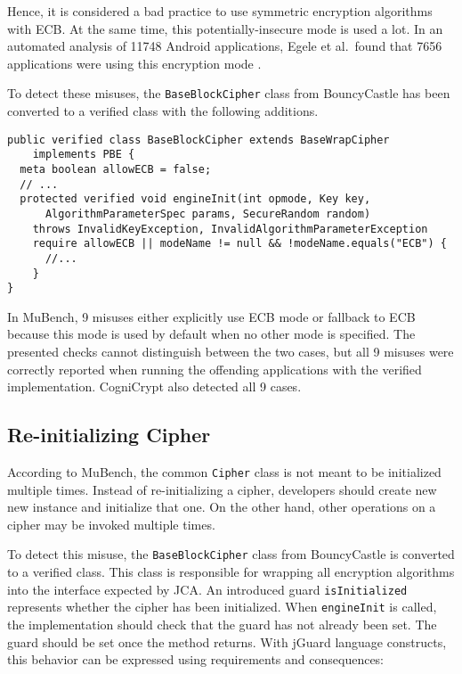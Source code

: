 \documentclass{article}
\newcommand{\etal}{et al.\ }
\begin{document}
Hence, it is considered a bad practice to use symmetric encryption algorithms with ECB.
At the same time, this potentially-insecure mode is used a lot.
In an automated analysis of \num{11748} Android applications, Egele \etal found that \num{7656}
applications were using this encryption mode .

To detect these misuses, the \texttt{BaseBlockCipher} class from BouncyCastle has been converted
to a verified class with the following additions.

\begin{lstlisting}[style=jGuard]
public verified class BaseBlockCipher extends BaseWrapCipher
    implements PBE {
  meta boolean allowECB = false;
  // ...
  protected verified void engineInit(int opmode, Key key, 
      AlgorithmParameterSpec params, SecureRandom random)
    throws InvalidKeyException, InvalidAlgorithmParameterException
    require allowECB || modeName != null && !modeName.equals("ECB") {
      //...
    }
}
\end{lstlisting}

In MuBench, \num{9} misuses either explicitly use ECB mode or fallback to ECB because this mode
is used by default when no other mode is specified.
The presented checks cannot distinguish between the two cases, but all \num{9} misuses were correctly
reported when running the offending applications with the verified implementation.
CogniCrypt also detected all \num{9} cases.

\subsection{Re-initializing Cipher}\label{sec:Crypto:ReInitCipher}

According to MuBench, the common \texttt{Cipher} class is not meant to be initialized multiple times.
Instead of re-initializing a cipher, developers should create new new instance
and initialize that one.
On the other hand, other operations on a cipher may be invoked multiple times.

To detect this misuse, the \texttt{BaseBlockCipher} class from BouncyCastle is converted to a verified
class. This class is responsible for wrapping all encryption algorithms into the interface
expected by JCA.
An introduced guard \texttt{isInitialized} represents whether the cipher has been initialized.
When \texttt{engineInit} is called, the implementation should check that the guard has not already been
set. The guard should be set once the method returns.
With jGuard language constructs, this behavior can be expressed using requirements and consequences:
\end{document}
